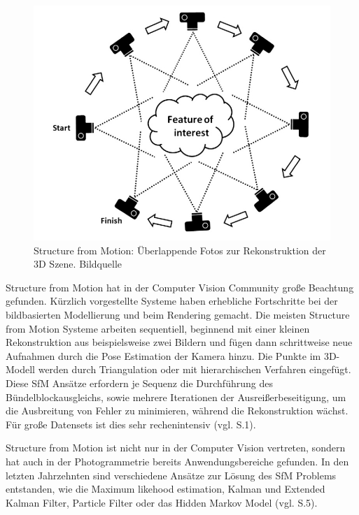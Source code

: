 \begin{figure}[H]
	\centering
	\includegraphics[scale=0.65]{sfm.png}
	\caption{Structure from Motion: Überlappende Fotos zur Rekonstruktion der 3D Szene. Bildquelle \cite{sfm_photo}}
\end{figure}  

Structure from Motion hat in der Computer Vision Community große Beachtung gefunden. Kürzlich vorgestellte Systeme haben erhebliche Fortschritte bei der bildbasierten Modellierung und beim Rendering gemacht. Die meisten Structure from Motion Systeme arbeiten sequentiell, beginnend mit einer kleinen Rekonstruktion aus beispielsweise zwei Bildern und fügen dann schrittweise neue Aufnahmen durch die Pose Estimation der Kamera hinzu. Die Punkte im 3D-Modell werden durch Triangulation oder mit hierarchischen Verfahren eingefügt. \\ Diese SfM Ansätze erfordern je Sequenz die Durchführung des Bündelblockausgleichs, sowie mehrere Iterationen der Ausreißerbeseitigung, um die Ausbreitung von Fehler zu minimieren, während die Rekonstruktion wächst. Für große Datensets ist dies sehr rechenintensiv (vgl. \cite{sfm} S.1).

Structure from Motion ist nicht nur in der Computer Vision vertreten, sondern hat auch in der Photogrammetrie bereits Anwendungsbereiche gefunden. In den letzten Jahrzehnten sind verschiedene Ansätze zur Lösung des SfM Problems entstanden, wie die \glqq Maximum likehood estimation\grqq{}, \glqq Kalman und Extended Kalman Filter\grqq{}, \glqq Particle Filter\grqq{} oder das \glqq Hidden Markov Model\grqq{} (vgl. \cite{efficient_bundle} S.5).

